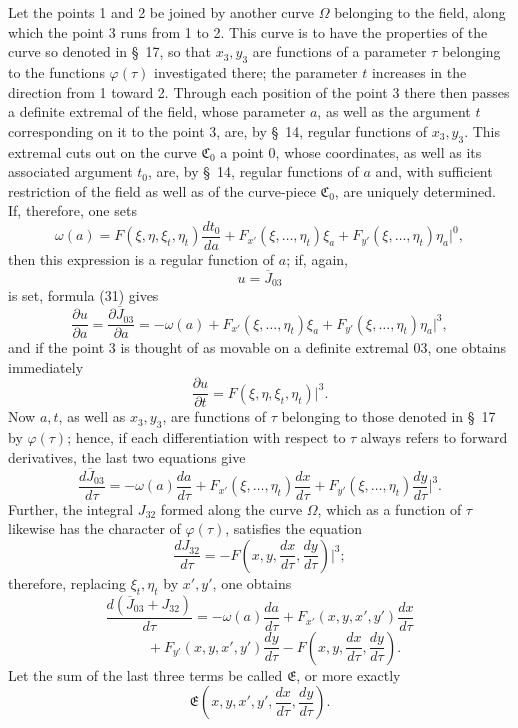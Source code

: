 \documentclass[11pt,a4paper,leqno]{article}
\begin{document}
 Let the points 1 and 2 be joined by another curve $\Omega$ belonging to the field, along which the point 3 runs from 1 to 2. This curve is to have the properties of the curve so denoted in \S~17, so that $x_3,y_3$ are functions of a parameter $\tau$ belonging to the functions $\varphi(\tau)$ investigated there; the parameter $t$ increases in the direction from 1 toward 2. Through each position of the point 3 there then passes a definite extremal of the field, whose parameter $a$, as well as the argument $t$ corresponding on it to the point 3, are, by \S~14, regular functions of $x_3,y_3$. This extremal cuts out on the curve $\mathfrak{C}_0$ a point 0, whose coordinates, as well as its associated argument $t_0$, are, by \S~14, regular functions of $a$ and, with sufficient restriction of the field as well as of the curve-piece $\mathfrak{C}_0$, are uniquely determined. If, therefore, one sets
\[
\omega(a)=
F(\xi,\eta,\xi_t,\eta_t)\frac{dt_0}{da}
+F_{x'}(\xi,\ldots,\eta_t)\xi_a
+F_{y'}(\xi,\ldots,\eta_t)\eta_a\bigg|^0,
\]
then this expression is a regular function of $a$; if, again,
\[
u=\overline{J}_{03}
\]
is set, formula (31) gives
\[
\frac{\partial u}{\partial a}
=
\frac{\partial\overline{J}_{03}}{\partial a}
=
-\omega(a)+F_{x'}(\xi,\ldots,\eta_t)\xi_a
+F_{y'}(\xi,\ldots,\eta_t)\eta_a\bigg|^3,
\]
and if the point 3 is thought of as movable on a definite extremal 03, one obtains immediately
\[
\frac{\partial u}{\partial t}=F(\xi,\eta,\xi_t,\eta_t)\bigg|^3.
\]
Now $a,t$, as well as $x_3,y_3$, are functions of $\tau$ belonging to those denoted in \S~17 by $\varphi(\tau)$; hence, if each differentiation with respect to $\tau$ always refers to forward derivatives, the last two equations give
\[
\frac{d\overline{J}_{03}}{d\tau}
=
-\omega(a)\frac{da}{d\tau}
+F_{x'}(\xi,\ldots,\eta_t)\frac{dx}{d\tau}
+F_{y'}(\xi,\ldots,\eta_t)\frac{dy}{d\tau}\bigg|^3.
\]
Further, the integral $J_{32}$ formed along the curve $\Omega$, which as a function of $\tau$ likewise has the character of $\varphi(\tau)$, satisfies the equation
\[
\frac{dJ_{32}}{d\tau}
=
-F\left(x,y,\frac{dx}{d\tau},\frac{dy}{d\tau}\right)\bigg|^3;
\]
therefore, replacing $\xi_t,\eta_t$ by $x',y'$, one obtains
\[
\frac{d(\overline{J}_{03}+J_{32})}{d\tau}
=
-\omega(a)\frac{da}{d\tau}
+F_{x'}(x,y,x',y')\frac{dx}{d\tau}
\]
\[
\qquad
+F_{y'}(x,y,x',y')\frac{dy}{d\tau}
-F\left(x,y,\frac{dx}{d\tau},\frac{dy}{d\tau}\right).
\]
Let the sum of the last three terms be called $\mathfrak{E}$, or more exactly
\[
\mathfrak{E}\left(x,y,x',y',\frac{dx}{d\tau},\frac{dy}{d\tau}\right).
\]
\end{document}
